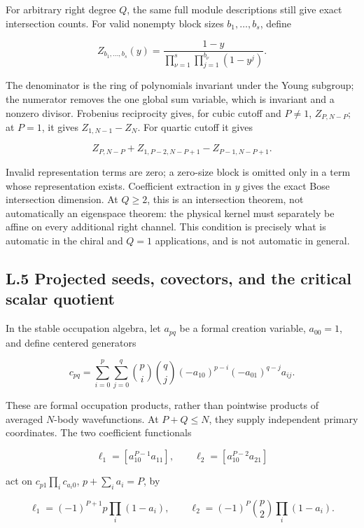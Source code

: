 For arbitrary right degree \(Q\), the same full module descriptions still give exact intersection counts. For valid nonempty block sizes \(b_1,\ldots,b_s\), define

\[
Z_{b_1,\ldots,b_s}(y)=\frac{1-y}
{\prod_{\nu=1}^s\prod_{j=1}^{b_\nu}(1-y^j)}.
\tag{L.15}
\]

The denominator is the ring of polynomials invariant under the Young subgroup; the numerator removes the one global sum variable, which is invariant and a nonzero divisor. Frobenius reciprocity gives, for cubic cutoff and \(P\ne1\), \(Z_{P,N-P}\); at \(P=1\), it gives \(Z_{1,N-1}-Z_N\). For quartic cutoff it gives

\[
Z_{P,N-P}+Z_{1,P-2,N-P+1}-Z_{P-1,N-P+1}.
\tag{L.16}
\]

Invalid representation terms are zero; a zero-size block is omitted only in a term whose representation exists. Coefficient extraction in \(y\) gives the exact Bose intersection dimension. At \(Q\ge2\), this is an intersection theorem, not automatically an eigenspace theorem: the physical kernel must separately be affine on every additional right channel. This condition is precisely what is automatic in the chiral and \(Q=1\) applications, and is not automatic in general.

\hypertarget{l.5-projected-seeds-covectors-and-the-critical-scalar-quotient}{%
\subsection{L.5 Projected seeds, covectors, and the critical scalar quotient}\label{l.5-projected-seeds-covectors-and-the-critical-scalar-quotient}}

In the stable occupation algebra, let \(a_{pq}\) be a formal creation variable, \(a_{00}=1\), and define centered generators

\[
c_{pq}=\sum_{i=0}^p\sum_{j=0}^q
\binom pi\binom qj(-a_{10})^{p-i}(-a_{01})^{q-j}a_{ij}.
\tag{L.17}
\]

These are formal occupation products, rather than pointwise products of averaged \(N\)-body wavefunctions. At \(P+Q\le N\), they supply independent primary coordinates. The two coefficient functionals

\[
\ell_1=[a_{10}^{P-1}a_{11}],\qquad
\ell_2=[a_{10}^{P-2}a_{21}]
\tag{L.18}
\]

act on \(c_{p1}\prod_i c_{a_i0}\), \(p+\sum_i a_i=P\), by

\[
\ell_1=(-1)^{P+1}p\prod_i(1-a_i),\qquad
\ell_2=(-1)^P\binom p2\prod_i(1-a_i).
\tag{L.19}
\]

